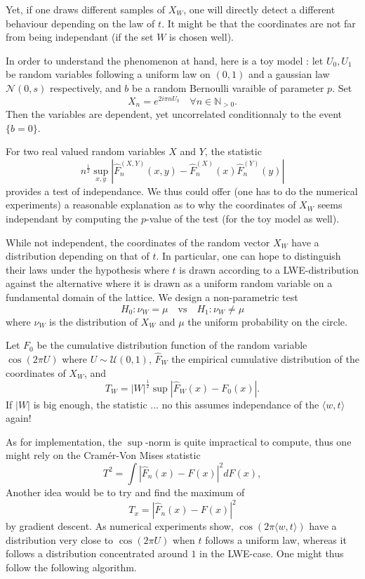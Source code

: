 Yet, if one draws different samples of $X_W$, one will directly detect a different behaviour depending on the law of $t$. It might be that the coordinates are not far from being independant (if the set $W$ is chosen well). 

In order to understand the phenomenon at hand, here is a toy model : let $U_0, U_1$ be random variables following a uniform law on $(0,1)$ and a gaussian law $\mathcal N(0,s)$ respectively, and $b$ be a random Bernoulli varaible of parameter $p$. Set 
$$X_n = e^{2i\pi n U_b}\quad \forall n \in \mathbb N_{>0}. $$
Then the variables are dependent, yet uncorrelated conditionnaly to the event $\{b = 0\}$.      

For two real valued random variables $X$ and $Y$, the statistic 
$$ n^{\frac{1}{2}}\sup_{x,y}|\hat F_n^{(X,Y)}(x,y) - \hat F_n^{(X)}(x) \hat F_n^{(Y)}(y)|$$
provides a test of independance. We thus could offer (one has to do the numerical experiments) a reasonable explanation as to why the coordinates of $X_W$ seems independant by computing the $p$-value of the test (for the toy model as well).

While not independent, the coordinates of the random vector $X_W$ have a distribution depending on that of $t$. In particular, one can hope to distinguish their laws under the hypothesis where $t$ is drawn according to a LWE-distribution against the alternative where it is drawn as a uniform random variable on a fundamental domain of the lattice. We design a non-parametric test 
$$ H_0 : \nu_W = \mu \quad \text{vs} \quad H_1 : \nu_W \neq \mu $$ 
where $\nu_W $ is the distribution of $X_W$ and $\mu$ the uniform probability on the circle. 

Let $F_0$ be the cumulative distribution function of the random variable $\cos(2\pi U)$ where $U\sim \mathcal U(0,1)$, $\hat F_W$ the empirical cumulative distribution of the coordinates of $X_W$, and
$$T_W = |W|^{\frac{1}{2}}\sup |\hat F_W(x) - F_0(x)|.$$
If $|W|$ is big enough, the statistic ... no this assumes independance of the $\langle w , t \rangle $ again!

As for implementation, the $\sup$-norm is quite impractical to compute, thus one might rely on the Cramér-Von Mises statistic
$$T^2 = \int |\hat F_n(x) -F(x)|^2 dF(x),$$
Another idea would be to try and find the maximum of 
$$T_x = |\hat F_n(x) -F(x)|^2 $$
by gradient descent. As numerical experiments show, $\cos(2 \pi\langle w , t\rangle)$ have a distribution very close to $\cos(2\pi U)$ when $t$ follows a uniform law, whereas it follows a distribution concentrated around $1$ in the LWE-case. One might thus follow the following algorithm.

